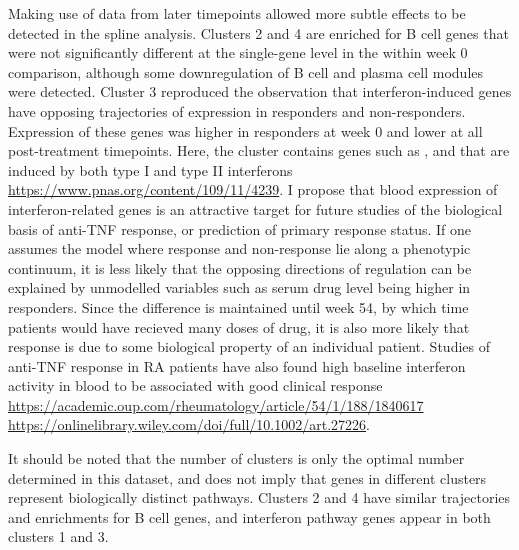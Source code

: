 Making use of data from later timepoints allowed more subtle effects to be detected in the spline analysis.
Clusters 2 and 4 are enriched for B cell genes that were not significantly different at the single-gene level in the within week 0 comparison,
although some downregulation of B cell and plasma cell modules were detected.
Cluster 3 reproduced the observation that interferon-induced genes have opposing trajectories of expression in responders and non-responders.
Expression of these genes was higher in responders at week 0 and lower at all post-treatment timepoints.
Here, the cluster contains genes such as ,  and  that are induced by both type I and type II interferons \url{https://www.pnas.org/content/109/11/4239}.
I propose that blood expression of interferon-related genes is an attractive target for future studies of the biological basis of anti-\gls{TNF} response,
or prediction of primary response status.
If one assumes the model where response and non-response lie along a phenotypic continuum,
it is less likely that the opposing directions of regulation can be explained by unmodelled variables such as serum drug level being higher in responders.
Since the difference is maintained until week 54, by which time patients would have recieved many doses of drug,
it is also more likely that response is due to some biological property of an individual patient.
Studies of anti-\gls{TNF} response in \gls{RA} patients have also 
found high baseline interferon activity in blood to be associated with good clinical response
\url{https://academic.oup.com/rheumatology/article/54/1/188/1840617}
\url{https://onlinelibrary.wiley.com/doi/full/10.1002/art.27226}.

It should be noted that the number of clusters is only the optimal number determined in this dataset,
and does not imply that genes in different clusters represent biologically distinct pathways.
Clusters 2 and 4 have similar trajectories and enrichments for B cell genes,
and interferon pathway genes appear in both clusters 1 and 3.

